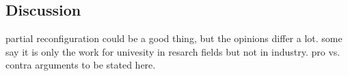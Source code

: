 \subsection{Discussion}
partial reconfiguration could be a good thing, but the opinions differ a lot. some say it is only
the work for univesity in resarch fields but not in industry. pro vs. contra arguments to be
stated here.